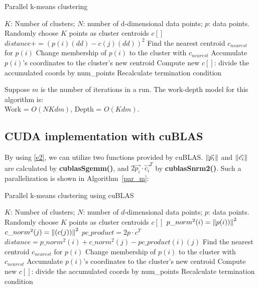 \begin{algorithm}[!h]
  \caption{Parallel k-means clustering} \label{par}
  \begin{algorithmic}[1]
    \INPUT $K$: Number of clusters; $N$: number of d-dimensional data points; $p$: data points.
     \label{alg:p}
    \State Randomly choose $K$ points as cluster centroids $c[]$
    \State $distance += (p(i)(dd) - c(j)(dd))^2$
    \EndFor
    \EndFor
    \State Find the nearest centroid $c_{nearest}$ for $p(i)$
    \State Change membership of $p(i)$ to the cluster with $c_{nearest}$
    \State Accumulate $p(i)$'s coordinates to the cluster's new centroid
    \EndParFor
    \State Compute new $c[]$: divide the accumulated coords by num\_points
    \State Recalculate termination condition
    \EndWhile
    \EndFunction  
  \end{algorithmic}
\end{algorithm}

\vspace{5mm}
\noindent
Suppose $m$ is the number of iterations in a run. The work-depth model for this algorithm is: \\
Work = $O(NKdm)$, Depth = $O(Kdm)$.



\subsection{CUDA implementation with cuBLAS}
\label{ss:cublas}

By using \ref{e2}, we can utilize two functions provided by cuBLAS.
$\left\lVert\vec{p_i}\right\rVert$ and $\left\lVert\vec{c_i}\right\rVert$ are calculated by \textbf{cublasSgemm()},
and $2\vec{p_i} \cdot \vec{c_i}^T$ by \textbf{cublasSnrm2()}.
Such a parallelization is shown in Algorithm~\ref{par_m}:

\begin{algorithm}[!h]
  \caption{Parallel k-means clustering using cuBLAS} \label{par_m}
  \begin{algorithmic}[1]
    \INPUT $K$: Number of clusters; $N$: number of $d$-dimensional data points; $p$: data points.
     \label{alg:pm}
    \State Randomly choose $K$ points as cluster centroids $c[]$
    \State $p\_norm^2(i) = \left\lVert p(i))\right\rVert^2$
    \EndFor
    \State $c\_norm^2(j) = \left\lVert(c(j))\right\rVert^2$
    \EndFor
    \State $pc\_product = 2 p \cdot c^T$
    \State $distance = p\_norm^2(i) + c\_norm^2(j) - pc\_product(i)(j)$
    \EndFor
    \State Find the nearest centroid $c_{nearest}$ for $p(i)$
    \State Change membership of $p(i)$ to the cluster with $c_{nearest}$
    \State Accumulate $p(i)$'s coordinates to the cluster's new centroid
    \EndParFor
    \State Compute new $c[]$: divide the accumulated coords by num\_points
    \State Recalculate termination condition
    \EndWhile
    \EndFunction
  \end{algorithmic}
\end{algorithm}


